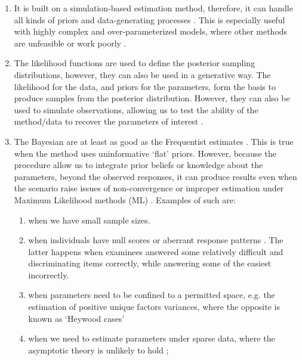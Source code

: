 \begin{enumerate}	
	\item It is built on a simulation-based estimation method, therefore, it can handle all kinds of priors and data-generating processes \cite{Fox_2010}. This is especially useful with highly complex and over-parameterized models, where other methods are unfeasible or work poorly \cite{Baker_1998, Kim_1999}. 
	
	\item The likelihood functions are used to define the posterior sampling distributions, however, they can also be used in a generative way. The likelihood for the data, and priors for the parameters, form the basis to produce samples from the posterior distribution. However, they can also be used to simulate observations, allowing us to test the ability of the method/data to recover the parameters of interest \cite{McElreath_2020}.
	
	\item The Bayesian are at least as good as the Frequentist estimates \cite{Baker_1998, Wollack_2002, Hsieh_2010}. This is true when the method uses uninformative `flat' priors. However, because the procedure allow us to integrate prior beliefs or knowledge about the parameters, beyond the observed responses, it can produce results even when the scenario raise issues of non-convergence or improper estimation under Maximum Likelihood methods (ML) \cite{Skrondal_et_al_2004a, Fox_2010, McElreath_2020}. Examples of such are: 
	
	\begin{enumerate}
		\item when we have small sample sizes.
		
		\item when individuals have null scores or aberrant response patterns \cite{Hambleton_et_al_1991a, Azevedo_2003}. The latter happens when examinees answered some relatively difficult and discriminating items correctly, while answering some of the easiest incorrectly.
		
		\item when parameters need to be confined to a permitted space, e.g. the estimation of positive unique factors variances, where the opposite is known as ‘Heywood cases’ \cite{Martin_et_al_1975}
		
		\item when we need to estimate parameters under sparse data, where the asymptotic theory is unlikely to hold \cite{Fox_2010};
		
	\end{enumerate}
	
\end{enumerate}

